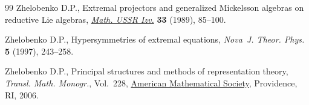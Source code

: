 \documentclass[pdftex]{sigma}
\numberwithin{equation}{section}
\begin{document}
\begin{thebibliography}{99}
Zhelobenko D.P., Extremal projectors and generalized {M}ickelsson algebras on
 reductive {L}ie algebras, \href{https://doi.org/10.1070/IM1989v033n01ABEH000815}{\textit{Math. USSR Izv.}} \textbf{33} (1989),
 85--100.

Zhelobenko D.P., Hypersymmetries of extremal equations, \textit{Nova~J. Theor.
 Phys.} \textbf{5} (1997), 243--258.

Zhelobenko D.P., Principal structures and methods of representation theory,
 \textit{Transl. Math. Monogr.}, Vol.~228, \href{https://doi.org/10.1090/mmono/228}{American Mathematical Society},
 Providence, RI, 2006.

\end{thebibliography}\LastPageEnding
\end{document}
